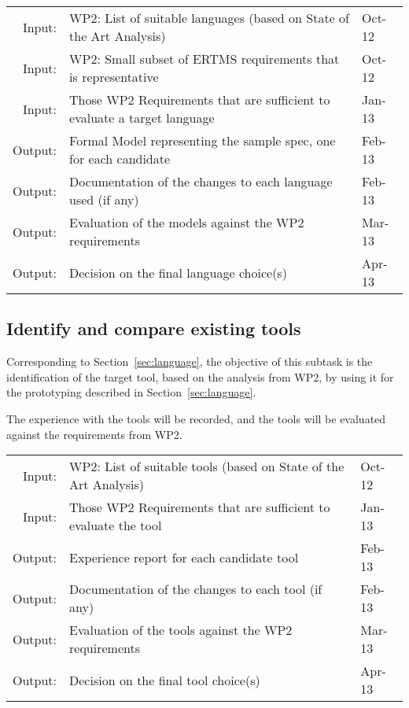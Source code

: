 \documentclass[11pt, a4paper]{article}
\let\oldmarginpar\marginpar
\renewcommand\marginpar[1]{\-\oldmarginpar[\raggedleft\scriptsize #1]%
{\raggedright\scriptsize #1}}
\newenvironment{inoutput}
{\vspace{2mm}
\noindent
\begin{tabular}{|r|p{.7\linewidth}|l|}
\hline}
{
\hline
\end{tabular}}
\begin{document}
\begin{inoutput}
Input: & WP2: List of suitable languages (based on State of the Art Analysis) & Oct-12 \\
Input: & WP2: Small subset of ERTMS requirements that is representative & Oct-12 \\
Input: & Those WP2 Requirements that are sufficient to evaluate a target language & Jan-13 \\
\hline
Output: & Formal Model representing the sample spec, one for each candidate & Feb-13 \\
Output: & Documentation of the changes to each language used (if any) & Feb-13 \\
Output: & Evaluation of the models against the WP2 requirements & Mar-13 \\
Output: & Decision on the final language choice(s) & Apr-13 \\
\end{inoutput}

\subsection{Identify and compare existing tools}
\label{sec:tool}

Corresponding to Section~\ref{sec:language}, the objective of this subtask is the identification of the target tool, based on the analysis from WP2, by using it for the prototyping described in Section~\ref{sec:language}.

The experience with the tools will be recorded, and the tools will be evaluated against the requirements from WP2.

\begin{inoutput}
Input: & WP2: List of suitable tools (based on State of the Art Analysis) & Oct-12 \\
Input: & Those WP2 Requirements that are sufficient to evaluate the tool & Jan-13 \\
\hline
Output: & Experience report for each candidate tool & Feb-13 \\
Output: & Documentation of the changes to each tool (if any) & Feb-13 \\
Output: & Evaluation of the tools against the WP2 requirements & Mar-13 \\
Output: & Decision on the final tool choice(s) & Apr-13 \\
\end{inoutput}
\end{document}
